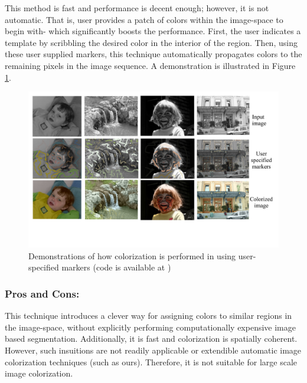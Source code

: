 \documentclass[10pt]{article}
\begin{document}
\vspace{1mm}
This method is fast and performance is decent enough; however, it is not automatic. That is, user provides a patch of colors within the image-space to begin with- which significantly boosts the performance. First, the user indicates a template by scribbling the desired color in the interior of the region. Then, using these user supplied markers, this technique automatically propagates colors to the remaining pixels in the image sequence. A demonstration is illustrated in Figure \ref{fig:res1}.


\begin{figure}[h]
\centering
\includegraphics[width=\linewidth]{Figs/5.pdf}
\vspace{-20mm}
\caption{Demonstrations of how colorization is performed in \cite{levin2004colorization} using user-specified markers (code is available at \cite{AnatCol}) }
\label{fig:res1}
\end{figure} 


\subsubsection{Pros and Cons:}
This technique introduces a clever way for assigning colors to similar regions in the image-space, without explicitly performing computationally expensive image based segmentation. Additionally, it is fast and colorization is spatially coherent.  
However, such insuitions are not readily applicable or extendible automatic image colorization techniques (such as ours). Therefore, it is not suitable for large scale image colorization. 
\end{document}
